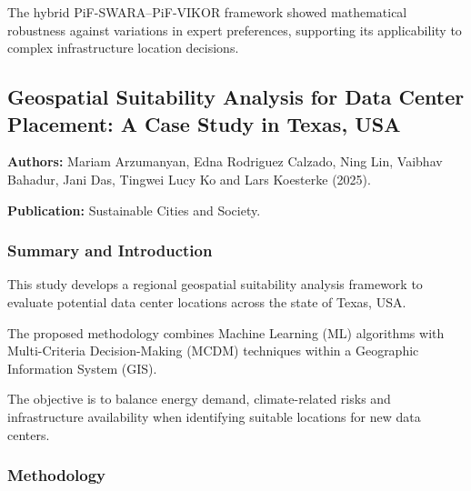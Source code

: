 The hybrid PiF-SWARA--PiF-VIKOR framework showed mathematical robustness against variations in expert preferences, supporting its applicability to complex infrastructure location decisions.



\subsection{Geospatial Suitability Analysis for Data Center Placement: A Case Study in Texas, USA}
\label{sec:dc_paper_2}

\noindent
\textbf{Authors:} Mariam Arzumanyan, Edna Rodriguez Calzado, Ning Lin, Vaibhav Bahadur, Jani Das, Tingwei Lucy Ko and Lars Koesterke (2025).

\noindent
\textbf{Publication:} Sustainable Cities and Society.

\subsubsection{Summary and Introduction}

This study develops a regional geospatial suitability analysis framework to evaluate potential data center locations across the state of Texas, USA.

The proposed methodology combines Machine Learning (ML) algorithms with Multi-Criteria Decision-Making (MCDM) techniques within a Geographic Information System (GIS).

The objective is to balance energy demand, climate-related risks and infrastructure availability when identifying suitable locations for new data centers.

\subsubsection{Methodology}

